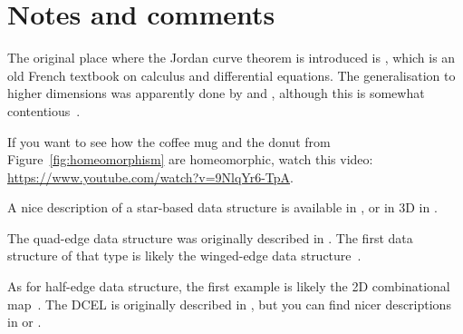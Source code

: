 %
\section{Notes and comments}

The original place where the Jordan curve theorem is introduced is  \citet{Jordan87}, which is an old French textbook on calculus and differential equations.
The generalisation to higher dimensions was apparently done by \citet{Lebesgue11} and \citet{Brouwer11}, although this is somewhat contentious~\citep[Ch.~5]{van-Dalen13}.


If you want to see how the coffee mug and the donut from Figure~\ref{fig:homeomorphism} are homeomorphic, watch this video: \url{https://www.youtube.com/watch?v=9NlqYr6-TpA}.

A nice description of a star-based data structure is available in \citet{Blandford05}, or in 3D in \citet{Ledoux13a}.

The quad-edge data structure was originally described in \citet{Guibas85}.
The first data structure of that type is likely the winged-edge data structure~\citet{Baumgart75}.

As for half-edge data structure, the first example is likely the 2D combinational map~\citep{Edmonds60}.
The DCEL is originally described in \citet{Muller78}, but you can find nicer descriptions in \citet{Worboys04} or \citet{deBerg08}.
